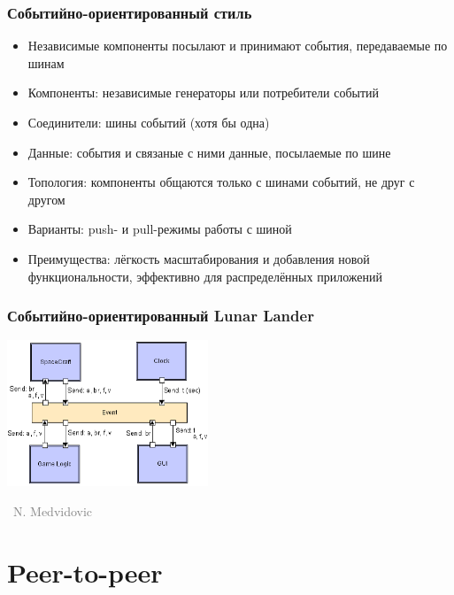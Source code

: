 \documentclass[xetex,mathserif,serif]{beamer}
\newcommand{\attribution}[1] {
    \vspace{-5mm}\begin{flushright}\begin{scriptsize}\textcolor{gray}{\textcopyright\, #1}\end{scriptsize}\end{flushright}
}
\begin{document}
    \begin{frame}
        \frametitle{Событийно-ориентированный стиль}
        \begin{itemize}
            \item Независимые компоненты посылают и принимают события, передаваемые по шинам
            \item Компоненты: независимые генераторы или потребители событий
            \item Соединители: шины событий (хотя бы одна)
            \item Данные: события и связаные с ними данные, посылаемые по шине
            \item Топология: компоненты общаются только с шинами событий, не друг с другом
            \item Варианты: push- и pull-режимы работы с шиной
            \item Преимущества: лёгкость масштабирования и добавления новой функциональности, эффективно для распределённых приложений
        \end{itemize}
    \end{frame}

    \begin{frame}
        \frametitle{Событийно-ориентированный Lunar Lander}
        \begin{center}
            \includegraphics[width=0.45\textwidth]{eventBasedLL.png}
            \attribution{N. Medvidovic}
        \end{center}
    \end{frame}

    \section{Peer-to-peer}
\end{document}
